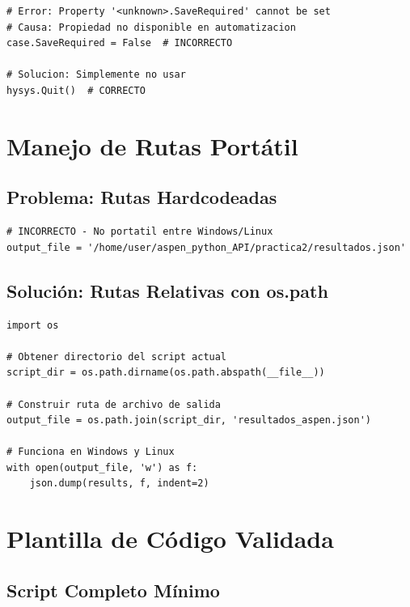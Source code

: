 \documentclass[12pt,a4paper]{article}
\begin{document}
\begin{lstlisting}
# Error: Property '<unknown>.SaveRequired' cannot be set
# Causa: Propiedad no disponible en automatizacion
case.SaveRequired = False  # INCORRECTO

# Solucion: Simplemente no usar
hysys.Quit()  # CORRECTO
\end{lstlisting}

\section{Manejo de Rutas Portátil}

\subsection{Problema: Rutas Hardcodeadas}

\begin{lstlisting}
# INCORRECTO - No portatil entre Windows/Linux
output_file = '/home/user/aspen_python_API/practica2/resultados.json'
\end{lstlisting}

\subsection{Solución: Rutas Relativas con os.path}

\begin{successbox}
\begin{lstlisting}
import os

# Obtener directorio del script actual
script_dir = os.path.dirname(os.path.abspath(__file__))

# Construir ruta de archivo de salida
output_file = os.path.join(script_dir, 'resultados_aspen.json')

# Funciona en Windows y Linux
with open(output_file, 'w') as f:
    json.dump(results, f, indent=2)
\end{lstlisting}
\end{successbox}

\section{Plantilla de Código Validada}

\subsection{Script Completo Mínimo}
\end{document}
